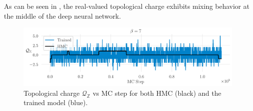 \documentclass{article} %
\begin{document}
%
As can be seen in , the real-valued topological charge exhibits mixing behavior at the middle of the
deep neural network.
%
\begin{figure}[htpb]
   \centering
   \includegraphics[width=\textwidth]{figures/topological_freezing_anl_blue_wide.pdf}
   \caption{\label{fig:topfreeze}Topological charge \(\mathcal{Q}_{\mathbb{Z}}\) vs MC
   step for both HMC (black) and the trained model (blue).}
\end{figure}
%
\end{document}
